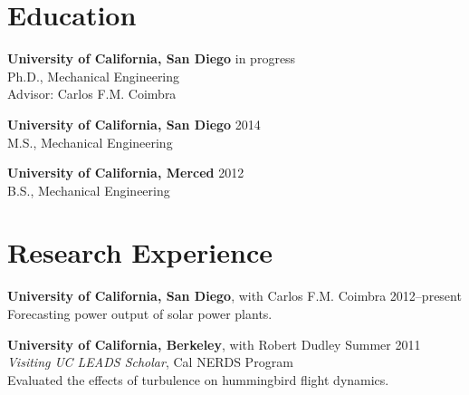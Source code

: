 \documentclass[]{res}
\begin{document}
\address{9500 Gilman Drive \#0411 \\ La Jolla, CA 92093--0411}
\address{dplarson@ucsd.edu}

\begin{resume}


\section{Education}
\vspace{0.1in}

\textbf{University of California, San Diego} \hfill in progress \\
Ph.D., Mechanical Engineering \\
Advisor: Carlos F.M. Coimbra \\

\vspace{-0.2in}

\textbf{University of California, San Diego} \hfill 2014 \\
M.S., Mechanical Engineering \\

\vspace{-0.2in}

\textbf{University of California, Merced} \hfill 2012 \\
B.S., Mechanical Engineering


\section{Research Experience}
\vspace{0.1in}

\textbf{University of California, San Diego}, with Carlos F.M. Coimbra \hfill 2012--present\\
Forecasting power output of solar power plants.

\textbf{University of California, Berkeley}, with Robert Dudley \hfill Summer 2011 \\
\textit{Visiting UC LEADS Scholar}, Cal NERDS Program \\
Evaluated the effects of turbulence on hummingbird flight dynamics.


\end{resume}
\end{document}
